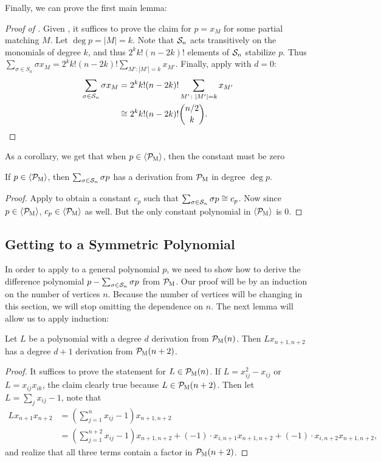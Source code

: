 Finally, we can prove the first main lemma:
\begin{proof}[Proof of ]
Given ,
it suffices to prove the claim for
\(p = x_{M}\) for some partial matching \(M\).
Let $\deg p = |M| = k$.
Note that $\mathcal S_n$ acts transitively on the monomials of degree $k$, and thus $2^k k! (n-2k)!$ elements of $\mathcal S_n$ stabilize $p$.
Thus $\sum_{\sigma \in S_n} \sigma x_M = 2^k k! (n-2k)!\sum_{M': |M'| = k} x_{M'}$.
Finally, apply  with $d = 0$:
\begin{equation*}
  \begin{split}
  \sum_{\sigma \in \mathcal S_{n}} \sigma x_{M}
  &= 2^{k} k! (n-2k)! \sum_{M' \colon \left|M'\right| = k} x_{M'} \\
  &\cong
  2^{k} k! (n-2k)! \binom{n/2}{k}.
  \end{split}
\end{equation*}
\end{proof}
As a corollary, we get that when $p \in \langle \mathcal P_{\textsc{M}} \rangle$, then the constant must be zero 
\begin{corollary}\label{cor:constantiszero}
If $p \in \langle \mathcal P_{\textsc{M}} \rangle$, then $\sum_{\sigma \in \mathcal S_n} \sigma p$ has a derivation from $\mathcal P_{\textsc{M}}$ in degree $\deg p$.
\end{corollary}
\begin{proof}
Apply  to obtain a constant $c_p$ such that $\sum_{\sigma \in \mathcal S_n} \sigma p \cong c_p$. 
Now since $p \in \langle \mathcal P_{\textsc{M}} \rangle$, $c_p \in \langle \mathcal P_{\textsc{M}} \rangle$ as well. But the only constant polynomial in $\langle \mathcal P_{\textsc{M}} \rangle$ is $0$.
\end{proof}

\subsection{Getting to a Symmetric Polynomial}
In order to apply  to a general polynomial $p$, we need to show how to derive the difference polynomial $p - \sum_{\sigma \in \mathcal S_n} \sigma p$ from $\mathcal P_{\textsc{M}}$. Our proof will be by an induction on the number of vertices $n$. Because the number of vertices will be changing in this section, we will stop omitting the dependence on $n$.
The next lemma will allow us to apply induction:
\begin{lemma}
  \label{lem:degree-increase}
  Let \(L\) be a polynomial with a degree $d$ derivation from $\mathcal P_{\textsc{M}}(n)$.
	Then $Lx_{n+1,n+2}$ has a degree $d+1$ derivation from $\mathcal P_{\textsc{M}}(n+2)$.
\end{lemma}
\begin{proof}
It suffices to prove the statement for $L \in \mathcal P_{\textsc{M}}(n)$. 
If $L = x_{ij}^2 - x_{ij}$ or $L = x_{ij}x_{ik}$, the claim clearly true because $L \in \mathcal P_{\textsc{M}}(n+2)$.
Then let $L = \sum_j x_{ij} - 1$, note that 
\begin{align*}
Lx_{n+1}x_{n+2} &= (\sum_{j=1}^n x_{ij} - 1)x_{n+1,n+2} \\
&= (\sum_{j=1}^{n+2} x_{ij} - 1)x_{n+1,n+2} + (-1)\cdot x_{i,n+1}x_{n+1,n+2} + (-1)\cdot x_{i,n+2}x_{n+1,n+2},
\end{align*}
and realize that all three terms contain a factor in $\mathcal P_{\textsc{M}}(n+2)$.
\end{proof}

